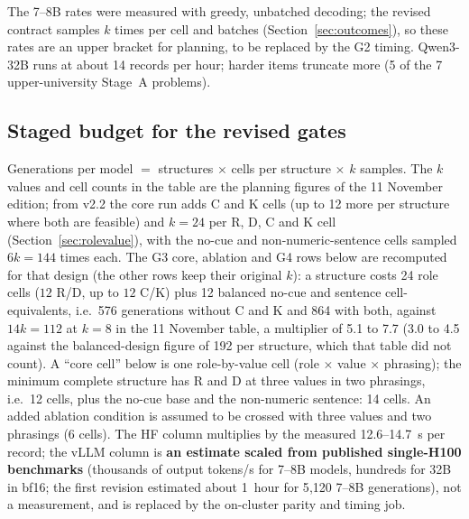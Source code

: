 \documentclass[10pt,a4paper]{article}
\begin{document}
The 7--8B rates were measured with greedy, unbatched decoding; the revised contract samples $k$ times per cell
and batches (Section~\ref{sec:outcomes}), so these rates are an upper bracket for planning, to be replaced by the
G2 timing. Qwen3-32B runs at about 14 records per hour; harder items truncate more (5 of the 7
upper-university Stage~A problems).

\subsection{Staged budget for the revised gates}
\label{sec:compute-budget}

Generations per model $=$ structures $\times$ cells per structure $\times$ $k$ samples. The $k$ values and cell counts in the table are the
planning figures of the 11 November edition; from v2.2 the core run adds C and K cells (up to 12 more per structure where both are
feasible) and $k=24$ per R, D, C and K cell (Section~\ref{sec:rolevalue}), with the no-cue and non-numeric-sentence cells sampled $6k=144$ times each. The G3 core, ablation and G4 rows
below are recomputed for that design (the other rows keep their original $k$): a structure costs 24 role cells ($12$ R/D, up to $12$ C/K)
plus 12 balanced no-cue and sentence cell-equivalents, i.e.\ 576 generations without C and K and 864 with both, against $14k=112$ at $k=8$ in the
11 November table, a multiplier of 5.1 to 7.7 (3.0 to 4.5 against the balanced-design figure of 192 per structure, which that table did not count). A ``core cell'' below is
one role-by-value cell (role $\times$ value $\times$ phrasing); the minimum complete structure has R and D at three
values in two phrasings, i.e.\ 12 cells, plus the no-cue base and the non-numeric sentence: 14 cells. An added
ablation condition is assumed to be crossed with three values and two phrasings (6 cells). The HF column multiplies by the measured 12.6--14.7~s per record; the vLLM
column is \textbf{an estimate scaled from published single-H100 benchmarks} (thousands of output tokens/s for
7--8B models, hundreds for 32B in bf16; the first revision estimated about 1~hour for 5{,}120 7--8B
generations), not a measurement, and is replaced by the on-cluster parity and timing job.
\end{document}
